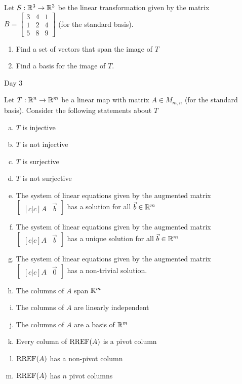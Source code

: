\documentclass{article}
\begin{document}
\begin{app}
Let $S: \mathbb{R}^3 \rightarrow \mathbb{R}^3$ be the linear transformation given by the matrix $B=\begin{bmatrix} 3 & 4 & 1 \\ 1 & 2 & 4 \\ 5 & 8 & 9  \end{bmatrix}$ (for the standard basis).
\begin{enumerate}[1)]
\item Find a set of vectors that span the image of $T$
\item Find a basis for the image of $T$.
\end{enumerate}

\end{app}


Day 3
\begin{app}
Let $T: \mathbb{R}^n \rightarrow \mathbb{R}^m$ be a linear map with matrix $A \in M_{m,n}$ (for the standard basis).  Consider the following statements about $T$
\begin{enumerate}[(a)]
\item $T$ is injective
\item $T$ is not injective
\item $T$ is surjective
\item $T$ is not surjective
\item The system of linear equations given by the augmented matrix $\begin{bmatrix}[c|c]A & \vec{b} \end{bmatrix}$ has a solution for all $\vec{b} \in \mathbb{R}^m$
\item The system of linear equations given by the augmented matrix $\begin{bmatrix}[c|c]A & \vec{b} \end{bmatrix}$ has a unique solution for all $\vec{b} \in \mathbb{R}^m$
\item The system of linear equations given by the augmented matrix $\begin{bmatrix}[c|c] A & \vec{0} \end{bmatrix}$ has a non-trivial solution.
\item The columns of $A$ span $\mathbb{R}^m$
\item The columns of $A$ are linearly independent
\item The columns of $A$ are a basis of $\mathbb{R}^m$
\item Every column of $\operatorname{RREF}(A)$ is a pivot column
\item $\operatorname{RREF}(A)$ has a non-pivot column
\item $\operatorname{RREF}(A)$ has $n$ pivot columns
\end{enumerate}


\end{app}
\end{document}
